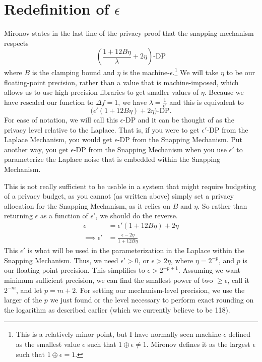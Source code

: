 \documentclass[11pt]{scrartcl} %
\begin{document}
\section{Redefinition of $\epsilon$}
\label{sec:redefine_epsilon}
Mironov states in the last line of the privacy proof that the snapping mechanism respects
\[ \left( \frac{1 + 12B\eta}{\lambda} + 2\eta \right)\text{-DP} \]
where $B$ is the clamping bound and $\eta$ is the machine-$\epsilon$.\footnote{This is a relatively minor point, but I have normally seen machine-$\epsilon$ defined as the smallest value $\epsilon$ such that $1 \oplus \epsilon \neq 1$. Mironov defines it as the largest $\epsilon$ such that $1 \oplus \epsilon = 1$.} We will take $\eta$ to be our floating-point precision, rather than a value that is machine-imposed, which allows us to use high-precision libraries to get smaller values of $\eta$.
Because we have rescaled our function to $\Delta f = 1$, we have $\lambda = \frac{1}{\epsilon'}$ and this is equivalent to
\[ \big( \epsilon'(1 + 12B\eta) + 2\eta \big)\text{-DP}. \]
For ease of notation, we will call this $\epsilon$-DP and it can be thought of as the privacy level relative to the Laplace. That is, if you were to get $\epsilon'$-DP from the Laplace Mechanism, you would get $\epsilon$-DP from the Snapping Mechanism. Put another way, you get $\epsilon$-DP from the Snapping Mechanism when you use $\epsilon'$ to parameterize the Laplace noise that is embedded within the Snapping Mechanism. \newline

This is not really sufficient to be usable in a system that might require budgeting of a privacy budget, as you cannot (as written above) simply set a privacy allocation for the Snapping Mechanism, as it relies on $B$ and $\eta$. So rather than returning $\epsilon$ as a function of $\epsilon'$, we should do the reverse.
\begin{align}
             \epsilon &= \epsilon'(1 + 12B\eta) + 2\eta \nonumber \\
    \implies \epsilon' &= \frac{\epsilon - 2\eta}{1 + 12B \eta} \nonumber
\end{align}
This $\epsilon'$ is what will be used in the parameterization in the Laplace within the Snapping Mechanism. Thus, we need $\epsilon' > 0$, or $\epsilon > 2\eta$, where $\eta = 2^{-p}$, and $p$ is our floating point precision. This simplifies to $\epsilon > 2^{-p+1}$. Assuming we want minimum sufficient precision, we can find the smallest power of two $\geq \epsilon$, call it $2^{-m}$, and let $p = m+2$. For setting our mechanism-level precision, we use the larger of the $p$ we just found or the level necessary to perform exact rounding on the logarithm as described earlier (which we currently believe to be 118).
\end{document}
